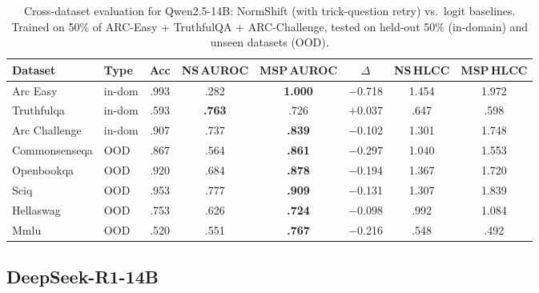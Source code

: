 \documentclass[11pt,a4paper]{article}
\begin{document}
\begin{table}[H]
\centering
\caption{Cross-dataset evaluation for Qwen2.5-14B: NormShift (with trick-question retry) vs.\ logit baselines.
         Trained on 50\% of ARC-Easy + TruthfulQA + ARC-Challenge,
         tested on held-out 50\% (in-domain) and unseen datasets (OOD).}
\label{tab:cross-dataset-qwen25-14b}
\small
\begin{tabular}{@{}llcccccc@{}}
\toprule
Dataset & Type & Acc & NS\,AUROC & MSP\,AUROC & $\Delta$ & NS\,HLCC & MSP\,HLCC \\
\midrule
Arc Easy             & in-dom & .993 & .282 & \textbf{1.000} & $-$0.718 & 1.454 & 1.972 \\
Truthfulqa           & in-dom & .593 & \textbf{.763} & .726 & $+$0.037 & .647 & .598 \\
Arc Challenge        & in-dom & .907 & .737 & \textbf{.839} & $-$0.102 & 1.301 & 1.748 \\
Commonsenseqa        & OOD & .867 & .564 & \textbf{.861} & $-$0.297 & 1.040 & 1.553 \\
Openbookqa           & OOD & .920 & .684 & \textbf{.878} & $-$0.194 & 1.367 & 1.720 \\
Sciq                 & OOD & .953 & .777 & \textbf{.909} & $-$0.131 & 1.307 & 1.839 \\
Hellaswag            & OOD & .753 & .626 & \textbf{.724} & $-$0.098 & .992 & 1.084 \\
Mmlu                 & OOD & .520 & .551 & \textbf{.767} & $-$0.216 & .548 & .492 \\
\bottomrule
\end{tabular}
\end{table}

\subsection{DeepSeek-R1-14B}
\end{document}
